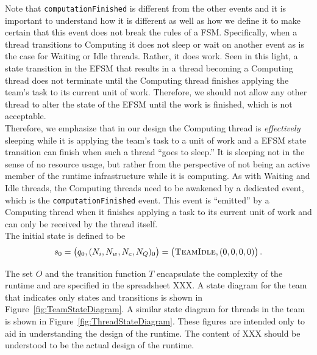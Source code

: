 \documentclass{article}
\newcommand{\TeamIdle}          {\textsc{TeamIdle}}
\begin{document}
Note that \texttt{computationFinished} is different from the other events and it
is important to understand how it is different as well as how we define it to
make certain that this event does not break the rules of a FSM.  Specifically,
when a thread transitions to Computing it does not sleep or wait on another
event as is the case for Waiting or Idle threads.  Rather, it does work.  Seen
in this light, a state transition in the EFSM that results in a thread becoming
a Computing thread does not terminate until the Computing thread finishes
applying the team's task to its current unit of work.  Therefore, we should not
allow any other thread to alter the state of the EFSM until the work is
finished, which is not acceptable.\\

Therefore, we emphasize that in our design the Computing thread is
\textit{effectively} sleeping while it is applying the team's task to a unit of
work and a EFSM state transition can finish when such a thread ``goes to
sleep.''  It is sleeping not in the sense of no resource usage, but rather from
the perspective of not being an active member of the runtime infrastructure
while it is computing.  As with Waiting and Idle threads, the Computing threads
need to be awakened by a dedicated event, which is the
\texttt{computationFinished} event.  This event is ``emitted'' by a Computing
thread when it finishes applying a task to its current unit of work and can only
be received by the thread itself.\\

The initial state is defined to be
\[
s_0 = \left(q_0, (N_i, N_w, N_c, N_Q)_0\right) = \left(\TeamIdle, (0, 0, 0, 0)\right).
\]

The set $O$ and the transition function $T$ encapsulate the complexity of the
runtime and are specified in the spreadsheet XXX.  A state diagram for the team
that indicates only states and transitions is shown in
Figure~\ref{fig:TeamStateDiagram}.  A similar state diagram for threads in the
team is shown in Figure~\ref{fig:ThreadStateDiagram}.  These figures are
intended only to aid in understanding the design of the runtime.  The content of
XXX should be understood to be the actual design of the runtime.\\
\end{document}
